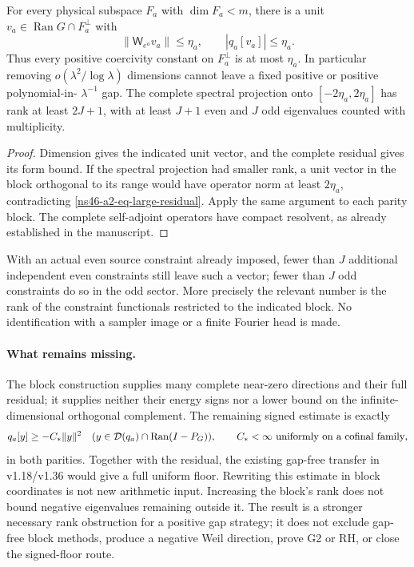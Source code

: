 \begin{corollary}
\label{ns46-a2-cor-rank}
For every physical subspace $F_a$ with $\dim F_a<m$, there is a
unit $v_a\in\operatorname{Ran}G\cap F_a^\perp$ with
\[
 \|\mathsf W_{e^a}v_a\|\le\eta_a,
 \qquad |q_a[v_a]|\le\eta_a.
\]
Thus every positive coercivity constant on $F_a^\perp$ is at most
$\eta_a$. In particular removing $o(\lambda^2/\log\lambda)$
dimensions cannot leave a fixed positive or positive polynomial-in-
$\lambda^{-1}$ gap. The complete spectral projection onto
$[-2\eta_a,2\eta_a]$ has rank at least $2J+1$, with at least
$J+1$ even and $J$ odd eigenvalues counted with multiplicity.
\end{corollary}
\begin{proof}
Dimension gives the indicated unit vector, and the complete residual
gives its form bound. If the spectral projection had smaller rank,
a unit vector in the block orthogonal to its range would have
operator norm at least $2\eta_a$, contradicting
\eqref{ns46-a2-eq-large-residual}. Apply the same argument to each
parity block. The complete self-adjoint operators have compact
resolvent, as already established in the manuscript.
\end{proof}
With an actual even source constraint already imposed, fewer than
$J$ additional independent even constraints still leave such a vector;
fewer than $J$ odd constraints do so in the odd sector. More precisely
the relevant number is the rank of the constraint functionals restricted
to the indicated block. No identification with a sampler image or a
finite Fourier head is made.

\paragraph{What remains missing.}
The block construction supplies many complete near-zero directions and
their full residual; it supplies neither their energy signs nor a lower
bound on the infinite-dimensional orthogonal complement. The remaining
signed estimate is exactly
\[
 q_a[y]\ge-C_*\|y\|^2\quad
 (y\in\mathcal D(q_a)\cap\operatorname{Ran}(I-P_G)),
 \qquad C_*<\infty\ \hbox{uniformly on a cofinal family},
\]
in both parities. Together with the residual, the existing gap-free
transfer in v1.18/v1.36 would give a full uniform floor. Rewriting this
estimate in block coordinates is not new arithmetic input. Increasing
the block's rank does not bound negative eigenvalues remaining outside
it. The result is a stronger necessary rank obstruction for a positive
gap strategy; it does not exclude gap-free block methods, produce a
negative Weil direction, prove G2 or RH, or close the signed-floor route.
